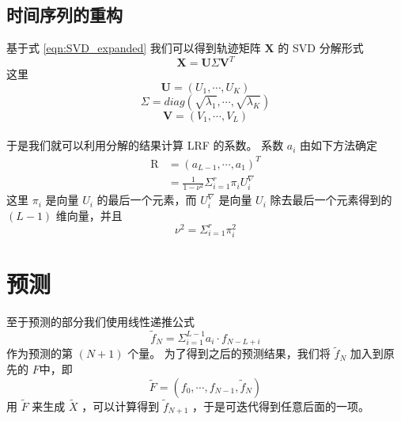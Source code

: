 \documentclass[a4paper]{article}
\begin{document}
\subsection{时间序列的重构}
基于式 \ref{eqn:SVD_expanded} 我们可以得到轨迹矩阵 $\textbf{X}$ 的 SVD 分解形式
\begin{equation}
	\label{eqn:SVD}
	\textbf{X} = \textbf{U} \Sigma \textbf{V}^T
\end{equation}
这里
\begin{equation}
	\label{eqn:SVD_U}
	\textbf{U} = (U_1, \cdots, U_K)
\end{equation}
\begin{equation}
	\label{eqn:SVD_Sigma}
	\Sigma = diag(\sqrt{\lambda_1}, \cdots, \sqrt{\lambda_K})
\end{equation}
\begin{equation}
	\label{eqn:SVD_V} 
	\textbf{V} = (V_1, \cdots, V_L)
\end{equation}
\\
\indent 于是我们就可以利用分解的结果计算 LRF 的系数。
系数 $a_i$ 由如下方法确定
\begin{align}
	\textrm{R} &= (a_{L-1}, \cdots, a_1)^T \\
	           &= \frac{1}{1-\nu^2} \Sigma_{i=1}^r \pi_i U_i^\nabla \label{eqn:R_a}
\end{align}
这里 $\pi_i$ 是向量 $U_i$ 的最后一个元素，而 $U_i^\nabla$ 是向量 $U_i$ 除去最后一个元素得到的 $(L-1)$ 维向量，并且
\begin{equation}
	\label{eqn:ssa_nu^2}
	\nu^2 = \Sigma_{i=1}^r \pi_i^2
\end{equation}

\section{预测}
至于预测的部分我们使用线性递推公式
\begin{equation}
	\label{eqn:ssa_prediction}
	\tilde{f}_N = \Sigma_{i=1}^{L-1} a_i \cdot f_{N-L+i} 
\end{equation}
作为预测的第 $(N+1)$ 个量。
为了得到之后的预测结果，我们将 $\tilde{f}_N$ 加入到原先的 $F$中，即
\begin{equation}
	\label{eqn:ssa_new_f}
	\tilde{F} = (f_0, \cdots, f_{N-1}, \tilde{f}_N)
\end{equation}
用 $\tilde{F}$ 来生成 $\tilde{X}$ ，可以计算得到 $\tilde{f}_{N+1}$ ，于是可迭代得到任意后面的一项。
\end{document}
